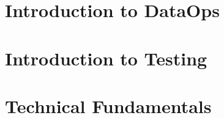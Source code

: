 

\section{Introduction to DataOps}
	
	\label{sec:2-dataops}
	
\section{Introduction to Testing}
	
	\label{sec:2-testing}
	
\section{Technical Fundamentals}
	
	\label{sec:2-tech-fundamentals}